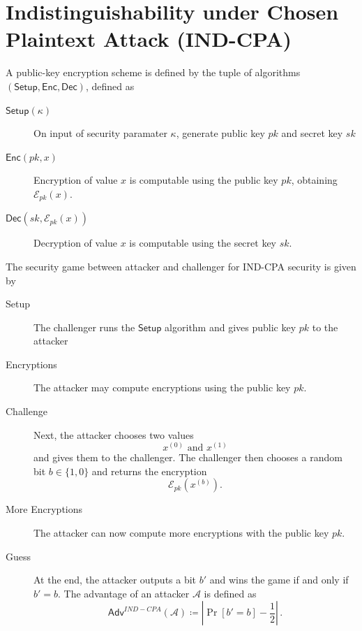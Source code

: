 \documentclass[twocolumn]{autart}
\begin{document}
\section{Indistinguishability under Chosen Plaintext Attack (IND-CPA)} \label{app:ind_cpa}
A public-key encryption scheme is defined by the tuple of algorithms $(\mathsf{Setup}, \mathsf{Enc}, \mathsf{Dec})$, defined as
\begin{description}
    \item[$\mathsf{Setup}(\kappa)$] On input of security paramater $\kappa$, generate public key $pk$ and secret key $sk$
    \item[$\mathsf{Enc}(pk, x)$] Encryption of value $x$ is computable using the public key $pk$, obtaining $\mathcal{E}_{pk}(x)$.
    \item[$\mathsf{Dec}(sk, \mathcal{E}_{pk}(x))$] Decryption of value $x$ is computable using the secret key $sk$.
\end{description}

The security game between attacker and challenger for IND-CPA security is given by
\begin{description}
    \item[Setup] The challenger runs the $\mathsf{Setup}$ algorithm and gives public key $pk$ to the attacker
    \item[Encryptions] The attacker may compute encryptions using the public key $pk$.
    \item[Challenge] Next, the attacker chooses two values
    \begin{equation*}
        x^{(0)} \text{ and } x^{(1)}
    \end{equation*}
    and gives them to the challenger. The challenger then chooses a random bit $b \in \{1,0\}$ and returns the encryption
    \begin{equation*}
        \mathcal{E}_{pk}(x^{(b)}).
    \end{equation*}
    \item[More Encryptions] The attacker can now compute more encryptions with the public key $pk$.
    \item[Guess] At the end, the attacker outputs a bit $b'$ and wins the game if and only if $b' = b$. The advantage of an attacker $\mathcal{A}$ is defined as
    \begin{equation*}
        \mathsf{Adv}^{IND-CPA}(\mathcal{A}) \coloneqq \left\lvert \Pr [b'=b] - \frac{1}{2}\right\rvert\,.
    \end{equation*} 
\end{description}
\end{document}
